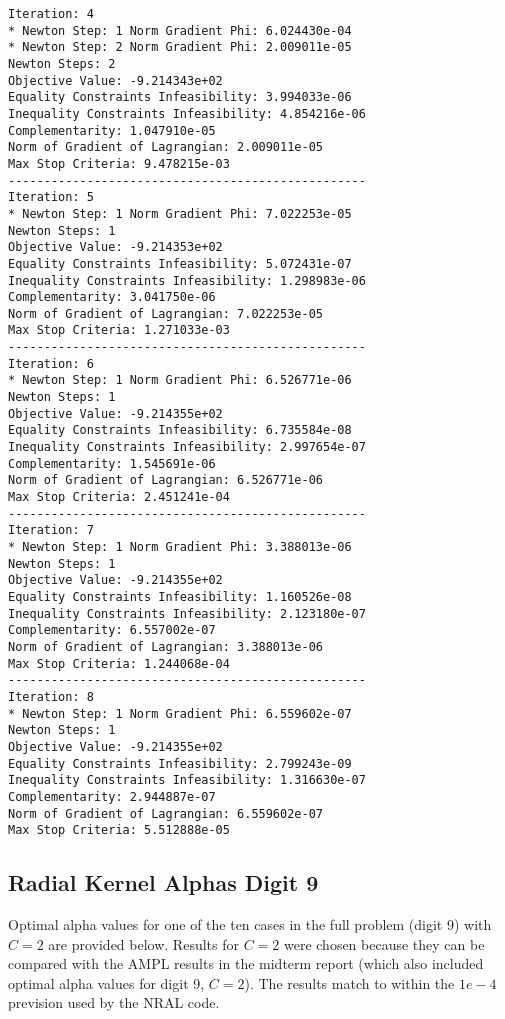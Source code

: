 \documentclass{article}
\begin{document}
\begin{minipage}[t]{0.45\textwidth}
\begin{verbatim}
Iteration: 4
* Newton Step: 1 Norm Gradient Phi: 6.024430e-04
* Newton Step: 2 Norm Gradient Phi: 2.009011e-05
Newton Steps: 2
Objective Value: -9.214343e+02
Equality Constraints Infeasibility: 3.994033e-06
Inequality Constraints Infeasibility: 4.854216e-06
Complementarity: 1.047910e-05
Norm of Gradient of Lagrangian: 2.009011e-05
Max Stop Criteria: 9.478215e-03
--------------------------------------------------
Iteration: 5
* Newton Step: 1 Norm Gradient Phi: 7.022253e-05
Newton Steps: 1
Objective Value: -9.214353e+02
Equality Constraints Infeasibility: 5.072431e-07
Inequality Constraints Infeasibility: 1.298983e-06
Complementarity: 3.041750e-06
Norm of Gradient of Lagrangian: 7.022253e-05
Max Stop Criteria: 1.271033e-03
--------------------------------------------------
Iteration: 6
* Newton Step: 1 Norm Gradient Phi: 6.526771e-06
Newton Steps: 1
Objective Value: -9.214355e+02
Equality Constraints Infeasibility: 6.735584e-08
Inequality Constraints Infeasibility: 2.997654e-07
Complementarity: 1.545691e-06
Norm of Gradient of Lagrangian: 6.526771e-06
Max Stop Criteria: 2.451241e-04
--------------------------------------------------
Iteration: 7
* Newton Step: 1 Norm Gradient Phi: 3.388013e-06
Newton Steps: 1
Objective Value: -9.214355e+02
Equality Constraints Infeasibility: 1.160526e-08
Inequality Constraints Infeasibility: 2.123180e-07
Complementarity: 6.557002e-07
Norm of Gradient of Lagrangian: 3.388013e-06
Max Stop Criteria: 1.244068e-04
--------------------------------------------------
Iteration: 8
* Newton Step: 1 Norm Gradient Phi: 6.559602e-07
Newton Steps: 1
Objective Value: -9.214355e+02
Equality Constraints Infeasibility: 2.799243e-09
Inequality Constraints Infeasibility: 1.316630e-07
Complementarity: 2.944887e-07
Norm of Gradient of Lagrangian: 6.559602e-07
Max Stop Criteria: 5.512888e-05
\end{verbatim}
\end{minipage}

\subsection{Radial Kernel Alphas Digit 9}\label{radiala9}
\normalsize

Optimal alpha values for one of the ten cases in the full problem (digit 9) with \(C=2\) are provided below. Results for \(C=2\) were chosen because they can be compared with the AMPL results in the midterm report (which also included optimal alpha values for digit 9, \(C=2\)). The results match to within the \(1e-4\) prevision used by the NRAL code.
\end{document}
